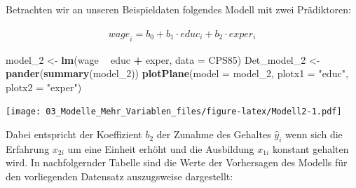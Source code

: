 \documentclass[]{article}
\newenvironment{Shaded}{\begin{snugshade}}{\end{snugshade}}
\newcommand{\KeywordTok}[1]{\textcolor[rgb]{0.13,0.29,0.53}{\textbf{#1}}}
\newcommand{\DataTypeTok}[1]{\textcolor[rgb]{0.13,0.29,0.53}{#1}}
\newcommand{\DecValTok}[1]{\textcolor[rgb]{0.00,0.00,0.81}{#1}}
\newcommand{\StringTok}[1]{\textcolor[rgb]{0.31,0.60,0.02}{#1}}
\newcommand{\OperatorTok}[1]{\textcolor[rgb]{0.81,0.36,0.00}{\textbf{#1}}}
\newcommand{\NormalTok}[1]{#1}
\begin{document}
Betrachten wir an unseren Beispieldaten folgendes Modell mit zwei
Prädiktoren:

\begin{eqnarray*} 
  \hat{wage}_i = b_0 + b_1 \cdot educ_{i} + b_2 \cdot exper_{i}
  \label{eq:LinModMultBsp}
\end{eqnarray*}

\begin{Shaded}
\begin{Highlighting}[]
\NormalTok{  model_}\DecValTok{2}\NormalTok{     <-}\StringTok{ }\KeywordTok{lm}\NormalTok{(wage }\OperatorTok{~}\StringTok{ }\NormalTok{educ }\OperatorTok{+}\StringTok{ }\NormalTok{exper, }\DataTypeTok{data =}\NormalTok{ CPS85)}
\NormalTok{  Det_model_}\DecValTok{2}\NormalTok{ <-}\StringTok{ }\KeywordTok{pander}\NormalTok{(}\KeywordTok{summary}\NormalTok{(model_}\DecValTok{2}\NormalTok{))}
  \KeywordTok{plotPlane}\NormalTok{(}\DataTypeTok{model =}\NormalTok{ model_}\DecValTok{2}\NormalTok{, }\DataTypeTok{plotx1 =} \StringTok{"educ"}\NormalTok{, }\DataTypeTok{plotx2 =} \StringTok{"exper"}\NormalTok{)}
\end{Highlighting}
\end{Shaded}

\texttt{[image: 03\_Modelle\_Mehr\_Variablen\_files/figure-latex/Modell2-1.pdf]}

Dabei entspricht der Koeffizient \(b_2\) der Zunahme des Gehaltes
\(\hat{y}_i\) wenn sich die Erfahrung \(x_{2i}\) um eine Einheit erhöht
und die Ausbildung \(x_{1i}\) konstant gehalten wird. In nachfolgernder
Tabelle sind die Werte der Vorhersagen des Modells für den vorliegenden
Datensatz auszugsweise dargestellt:
\end{document}

